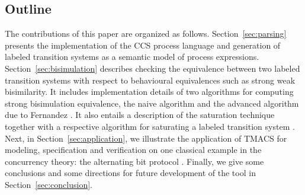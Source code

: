 \subsection{Outline} 
The contributions of this paper are organized as follows. 
Section~\ref{sec:parsing} presents the implementation of the CCS process language and generation of labeled transition systems as a semantic model of process expressions.
Section~\ref{sec:bisimulation} describes 
checking the equivalence between two labeled transition systems with respect to behavioural equivalences such as strong weak bisimilarity. It includes implementation details of two algorithms for computing strong bisimulation equivalence, the naive algorithm \cite{ReactiveSystems} and the advanced algorithm due to Fernandez \cite{Fernandez}. It also entails a description of the saturation technique together with a respective algorithm for saturating a labeled transition system
\cite{ReactiveSystems}. 
Next, in Section~\ref{sec:application}, we illustrate the application of TMACS for modeling, specification and verification on one classical example in the concurrency theory: the alternating bit protocol \cite{ABP1}\cite{ABP2}. 
Finally, we give some conclusions and some directions for future development of the tool in Section~\ref{sec:conclusion}. 
